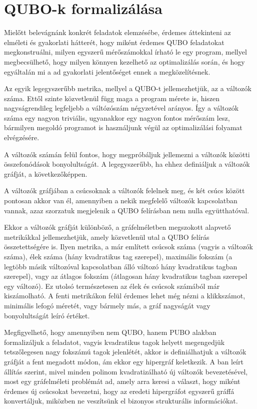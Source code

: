 \section{QUBO-k formalizálása}\label{sec:QUBOform}

Mielőtt belevágnánk konkrét feladatok elemzésébe, érdemes áttekinteni az elméleti és gyakorlati hátterét, hogy miként érdemes QUBO feladatokat megkonstruálni, milyen egyszerű mérőszámokkal írható le egy program, mellyel megbecsülhető, hogy milyen könnyen kezelhető az optimalizálás során, és hogy egyáltalán mi a ad gyakorlati jelentőséget ennek a megközelítésnek.

Az egyik legegyszerűbb metrika, mellyel a QUBO-t jellemezhetjük, az a változók száma. Ettől szinte közvetlenül függ maga a program mérete is, hiszen nagyságrendileg legfeljebb a váltózószám négyzetével arányos. Így a változók száma egy nagyon triviális, ugyanakkor egy nagyon fontos mérőszám lesz, bármilyen megoldó programot is használjunk végül az optimalizálási folyamat elvégzésére.

A változók számán felül fontos, hogy megpróbáljuk jellemezni a változók közötti összefonódások bonyolultságát. A legegyszerűbb, ha ehhez definiáljuk a változók gráfját, a következőképpen.

A változók gráfjában a csúcsoknak a változók felelnek meg, és két csúcs között pontosan akkor van él, amennyiben a nekik megfelelő változók kapcsolatban vannak, azaz szorzatuk megjelenik a QUBO felírásban nem nulla együtthatóval.

Ekkor a változók gráfját különböző, a gráfelméletben megszokott alapvető metrikákkal jellemezhetjük, amely közvetlenül utal a QUBO felírás összetettségére is. Ilyen metrika, a már említett csúcsok száma (vagyis a változók száma), élek száma (hány kvadratikus tag szerepel), maximális fokszám (a legtöbb másik változóval kapcsolatban álló változó hány kvadratikus tagban szerepel), vagy az átlagos fokszám (átlagosan hány kvadratikus tagban szerepel egy változó). Ez utolsó természetesen az élek és csúcsok számából már kiszámolható. A fenti metrikákon felül érdemes lehet még nézni a klikkszámot, minimális lefogó méretét, vagy bármely más, a gráf nagyságát vagy bonyolultságát leíró értéket.

Megfigyelhető, hogy amennyiben nem QUBO, hanem PUBO alakban formalizáljuk a feladatot, vagyis kvadratikus tagok helyett megengedjük tetszőlegesen nagy fokszámú tagok jelenlétét, akkor is definiálhatjuk a változók gráfját a fent megadott módon, ám ekkor egy hipergráf keletkezik. A ban leírt állítás szerint, mivel minden polinom kvadratizálható új változók bevezetésével, most egy gráfelméleti problémát ad, amely arra keresi a választ, hogy miként érdemes új csúcsokat bevezetni, hogy az eredeti hipergráfot egyszerű gráffá konvertáljuk, miközben ne veszítsünk el bizonyos strukturális információkat.


